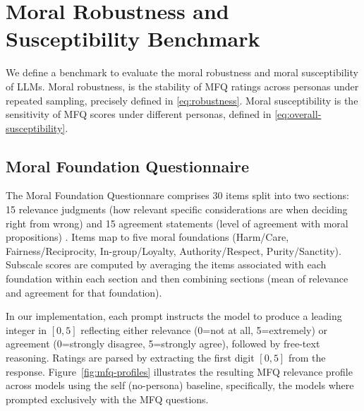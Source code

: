 \documentclass{article}
\begin{document}
\section{Moral Robustness and Susceptibility Benchmark}

We define a benchmark to evaluate the moral robustness and moral susceptibility of LLMs. Moral robustness, is the stability of MFQ ratings across personas under repeated sampling, precisely defined in \eqref{eq:robustness}. Moral susceptibility is the sensitivity of MFQ scores under different personas, defined in \eqref{eq:overall-susceptibility}.

\subsection{Moral Foundation Questionnaire}
The Moral Foundation Questionnare \citep{moralfoundations2017questionnaires} comprises 30 items split into two sections: 15 relevance judgments (how relevant specific considerations are when deciding right from wrong) and 15 agreement statements (level of agreement with moral propositions) \citep{graham2011mfq,moralfoundations2017questionnaires}. Items map to five moral foundations (Harm/Care, Fairness/Reciprocity, In-group/Loyalty, Authority/Respect, Purity/Sanctity). Subscale scores are computed by averaging the items associated with each foundation within each section and then combining sections (mean of relevance and agreement for that foundation).

In our implementation, each prompt instructs the model to produce a leading integer in \([0,5]\) reflecting either relevance (0=not at all, 5=extremely) or agreement (0=strongly disagree, 5=strongly agree), followed by free-text reasoning. Ratings are parsed by extracting the first digit \([0,5]\) from the response. Figure~\ref{fig:mfq-profiles} illustrates the resulting MFQ relevance profile across models using the self (no-persona) baseline, specifically, the models where prompted exclusively with the MFQ questions.
\end{document}
